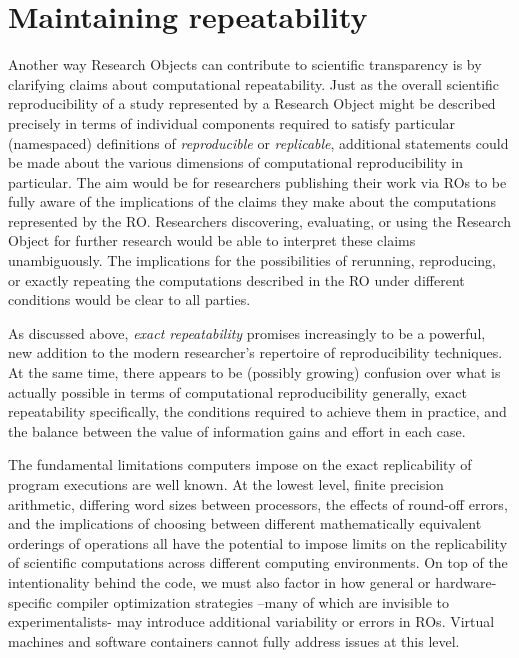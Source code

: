 \section{Maintaining repeatability}\label{sec-limitations}

Another way Research Objects can contribute to scientific transparency is by
	clarifying claims about computational repeatability.
Just as the overall scientific reproducibility of a study represented by a Research Object
	might be described precisely in terms of individual components required to
	satisfy particular (namespaced) definitions of \emph{reproducible} or \emph{replicable},
	additional statements could be made about the various dimensions of computational
	reproducibility in particular.
The aim would be for researchers publishing their work via ROs to be fully aware
	of the implications of the claims they make about the computations represented
	by the RO.
Researchers discovering, evaluating, or using the Research Object for further research
	 would be able to interpret these claims unambiguously.
The implications for the possibilities of rerunning, reproducing, or exactly repeating the
	computations described in the RO under different conditions would be clear
	to all parties.

As discussed above, \emph{exact repeatability} promises increasingly to be a powerful,
	new addition to the modern researcher's repertoire of reproducibility techniques.
At the same time, there appears to be (possibly growing) confusion over what is actually
	possible in terms of computational reproducibility generally, exact repeatability
	specifically, the conditions required to achieve them in practice, and the balance
    between the value of information gains and effort in each case.

The fundamental limitations computers impose on the exact replicability of program executions
	are well known.
At the lowest level, finite precision arithmetic, differing word sizes between processors,
	the effects of round-off errors, and the implications of choosing between different
	mathematically equivalent orderings of operations all have the potential to
	impose limits on the replicability of scientific computations across different computing
    environments. On top of the intentionality behind the code, we must also factor in how
    general or hardware-specific compiler optimization strategies --many of which are invisible
    to experimentalists- may introduce additional variability or errors in ROs.
Virtual machines and software containers cannot fully address issues at this level.


